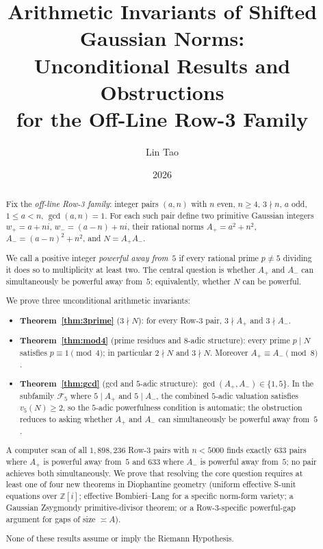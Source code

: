 \documentclass[12pt]{amsart}
\theoremstyle{plain}
\theoremstyle{definition}
\theoremstyle{remark}
\newcommand{\ZZ}{\mathbb{Z}}
\newcommand{\Aplus}{A_{+}}
\newcommand{\Aminus}{A_{-}}
\begin{document}
\title[Gaussian Powerful Norms in the Row-3 Family]{%
  Arithmetic Invariants of Shifted Gaussian Norms:\\
  Unconditional Results and Obstructions\\
  for the Off-Line Row-3 Family}

\author{Lin Tao}
\date{2026}

\begin{abstract}
Fix the \emph{off-line Row-3 family}: integer pairs $(a,n)$ with $n$ even,
$n\geq 4$, $3\nmid n$, $a$ odd, $1\leq a < n$, $\gcd(a,n)=1$.
For each such pair define two primitive Gaussian integers
$w_{+}=a+ni$, $w_{-}=(a-n)+ni$, their rational norms
$\Aplus = a^2+n^2$, $\Aminus = (a-n)^2+n^2$, and $N=\Aplus\Aminus$.

We call a positive integer \emph{powerful away from~$5$} if every
rational prime $p\neq 5$ dividing it does so to multiplicity at least two.
The central question is whether $\Aplus$ and $\Aminus$ can simultaneously
be powerful away from~$5$; equivalently, whether $N$ can be powerful.

We prove three unconditional arithmetic invariants:
\begin{itemize}
\item \textbf{Theorem~\ref{thm:3prime}} ($3\nmid N$):
  for every Row-3 pair, $3\nmid\Aplus$ and $3\nmid\Aminus$.
\item \textbf{Theorem~\ref{thm:mod4}} (prime residues and $8$-adic structure):
  every prime $p\mid N$ satisfies $p\equiv 1\pmod{4}$;
  in particular $2\nmid N$ and $3\nmid N$.  Moreover $\Aplus\equiv\Aminus\pmod{8}$.
\item \textbf{Theorem~\ref{thm:gcd}} (gcd and $5$-adic structure):
  $\gcd(\Aplus,\Aminus)\in\{1,5\}$.  In the subfamily $\mathcal{F}_5$
  where $5\mid\Aplus$ and $5\mid\Aminus$, the combined
  $5$-adic valuation satisfies $v_5(N)\geq 2$, so the $5$-adic
  powerfulness condition is automatic; the obstruction reduces to asking
  whether $\Aplus$ and $\Aminus$ can simultaneously be powerful away from~$5$.
\end{itemize}

A computer scan of all $1{,}898{,}236$ Row-3 pairs with $n<5000$ finds
exactly $633$ pairs where $\Aplus$ is powerful away from~$5$ and $633$
where $\Aminus$ is powerful away from~$5$; no pair achieves both
simultaneously.  We prove that resolving the core question requires at least
one of four new theorems in Diophantine geometry
(uniform effective S-unit equations over $\ZZ[i]$; effective Bombieri--Lang
for a specific norm-form variety; a Gaussian Zsygmondy primitive-divisor theorem;
or a Row-3-specific powerful-gap argument for gaps of size $\asymp A$).

None of these results assume or imply the Riemann Hypothesis.
\end{abstract}
\end{document}

